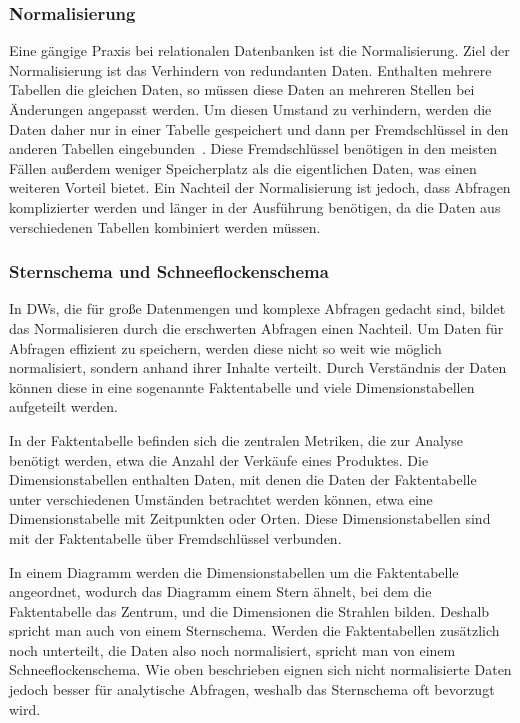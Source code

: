 \subsubsection{Normalisierung}
Eine gängige Praxis bei relationalen Datenbanken ist die Normalisierung.
Ziel der Normalisierung ist das Verhindern von redundanten Daten.
Enthalten mehrere Tabellen die gleichen Daten, so müssen diese Daten an mehreren Stellen bei Änderungen angepasst werden.
Um diesen Umstand zu verhindern, werden die Daten daher nur in einer Tabelle gespeichert und dann per Fremdschlüssel in den anderen Tabellen eingebunden~\cite[S.~24f]{vaisman_data_2022}.
Diese Fremdschlüssel benötigen in den meisten Fällen außerdem weniger Speicherplatz als die eigentlichen Daten, was einen weiteren Vorteil bietet.
Ein Nachteil der Normalisierung ist jedoch, dass Abfragen komplizierter werden und länger in der Ausführung benötigen, da die Daten aus verschiedenen Tabellen kombiniert werden müssen.

\subsubsection{Sternschema und Schneeflockenschema}
In \acp{DW}, die für große Datenmengen und komplexe Abfragen gedacht sind, bildet das Normalisieren durch die erschwerten Abfragen einen Nachteil.
Um Daten für Abfragen effizient zu speichern, werden diese nicht so weit wie möglich normalisiert, sondern anhand ihrer Inhalte verteilt. 
Durch Verständnis der Daten können diese in eine sogenannte Faktentabelle und viele Dimensionstabellen aufgeteilt werden.

In der Faktentabelle befinden sich die zentralen Metriken, die zur Analyse benötigt werden, etwa die Anzahl der Verkäufe eines Produktes.
Die Dimensionstabellen enthalten Daten, mit denen die Daten der Faktentabelle unter verschiedenen Umständen betrachtet werden können, etwa eine Dimensionstabelle mit Zeitpunkten oder Orten.
Diese Dimensionstabellen sind mit der Faktentabelle über Fremdschlüssel verbunden.

In einem Diagramm werden die Dimensionstabellen um die Faktentabelle angeordnet, wodurch das Diagramm einem Stern ähnelt, bei dem die Faktentabelle das Zentrum, und die Dimensionen die Strahlen bilden.
Deshalb spricht man auch von einem Sternschema.
Werden die Faktentabellen zusätzlich noch unterteilt, die Daten also noch normalisiert, spricht man von einem Schneeflockenschema.
Wie oben beschrieben eignen sich nicht normalisierte Daten jedoch besser für analytische Abfragen, weshalb das Sternschema oft bevorzugt wird.

